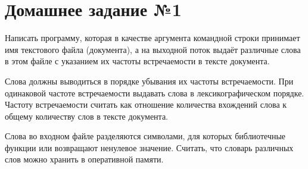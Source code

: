 \section*{Домашнее задание №1}

Написать программу, которая в качестве аргумента командной строки
принимает имя текстового файла (документа), а на выходной поток выдаёт
различные слова в этом файле с указанием их частоты встречаемости в
тексте документа.

Слова должны выводиться в порядке убывания их
частоты встречаемости. При одинаковой частоте встречаемости выдавать
слова в лексикографическом порядке. Частоту встречаемости считать как
отношение количества вхождений слова к общему количеству слов в
тексте документа.

Слова во входном файле разделяются символами, для
которых библиотечные функции  или  возвращают
ненулевое значение. Считать, что словарь различных слов можно хранить в
оперативной памяти.
